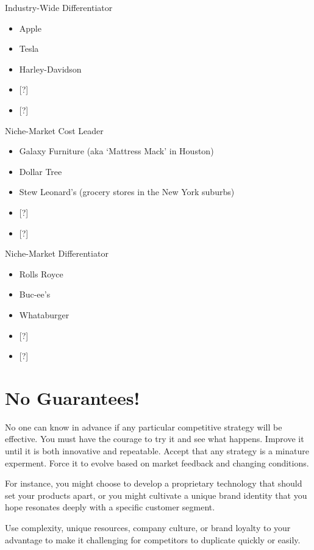 \documentclass[
]{book}
\begin{document}
{Industry-Wide} {Differentiator}

\begin{itemize}
\item
  Apple
\item
  Tesla
\item
  Harley-Davidson
\item
  {[}?{]}
\item
  {[}?{]}
\end{itemize}

{Niche-Market} { Cost Leader}

\begin{itemize}
\item
  Galaxy Furniture (aka `Mattress Mack' in Houston)
\item
  Dollar Tree
\item
  Stew Leonard's (grocery stores in the New York suburbs)
\item
  {[}?{]}
\item
  {[}?{]}
\end{itemize}

{Niche-Market} { Differentiator}

\begin{itemize}
\item
  Rolls Royce
\item
  Buc-ee's
\item
  Whataburger
\item
  {[}?{]}
\item
  {[}?{]}
\end{itemize}

\hypertarget{no-guarantees}{%
\section{No Guarantees!}\label{no-guarantees}}

No one can know in advance if any particular competitive strategy will be effective. You must have the courage to try it and see what happens. Improve it until it is both innovative and repeatable. Accept that any strategy is a minature experment. Force it to evolve based on market feedback and changing conditions.

For instance, you might choose to develop a proprietary technology that should set your products apart, or you might cultivate a unique brand identity that you hope resonates deeply with a specific customer segment.

Use complexity, unique resources, company culture, or brand loyalty to your advantage to make it challenging for competitors to duplicate quickly or easily.
\end{document}
